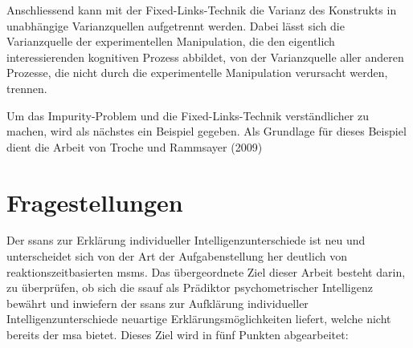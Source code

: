 \documentclass[11pt, twoside, a4paper]{book}		%
\begin{document}
Anschliessend kann mit der Fixed-Links-Technik die Varianz des Konstrukts in unabhängige Varianzquellen aufgetrennt werden. Dabei lässt sich die Varianzquelle der experimentellen Manipulation, die den eigentlich interessierenden kognitiven Prozess abbildet, von der Varianzquelle aller anderen Prozesse, die nicht durch die experimentelle Manipulation verursacht werden, trennen.

Um das Impurity-Problem und die Fixed-Links-Technik verständlicher zu machen, wird als nächstes ein Beispiel gegeben. Als Grundlage für dieses Beispiel dient die Arbeit von Troche und Rammsayer (2009)

\section{Fragestellungen \label{sec:Fragestellungen}}

Der \gls{ssans} zur Erklärung individueller Intelligenzunterschiede ist neu und unterscheidet sich von der Art der Aufgabenstellung her deutlich von reaktionszeitbasierten \glspl{msm}. Das übergeordnete Ziel dieser Arbeit besteht darin, zu überprüfen, ob sich die \gls{ssauf} als Prädiktor psychometrischer Intelligenz bewährt und inwiefern der \gls{ssans} zur Aufklärung individueller Intelligenzunterschiede neuartige Erklärungsmöglichkeiten liefert, welche nicht bereits der \gls{msa} bietet. Dieses Ziel wird in fünf Punkten abgearbeitet:
\end{document}
